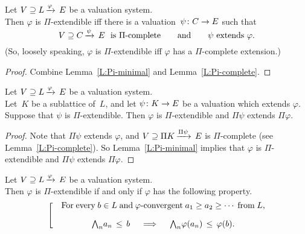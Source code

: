 \documentclass[main.tex]{subfiles}
\begin{document}
%
%
\begin{cor}
Let $V \supseteq L\,\smash{\xrightarrow{\varphi}\,E}$ be a valuation system.\\
Then $\varphi$ is $\Pi$-extendible
iff 
there is a valuation~$\psi\colon C\rightarrow E$
such that 
\begin{equation*}
V \supseteq C\,\smash{\xrightarrow{\psi}\,E}\text{ \ is $\Pi$-complete}
\qquad\text{and}\qquad
\psi\text{ extends }\varphi.
\end{equation*}
(So, loosely speaking,
$\varphi$ is $\Pi$-extendible
iff $\varphi$ has a $\Pi$-complete extension.)
\end{cor}
\begin{proof}
Combine Lemma~\ref{L:Pi-minimal}
and Lemma~\ref{L:Pi-complete}.
\end{proof}
%
%
\begin{lem}
\label{L:Pi-monotonous}
Let $V \supseteq L\,\smash{\xrightarrow{\varphi}\,E}$ be a valuation system.\\
Let~$K$ be a sublattice of~$L$,
and let $\psi\colon K\rightarrow E$ be a valuation
which extends $\varphi$.\\
Suppose that $\psi$ is $\Pi$-extendible.
Then $\varphi$ is $\Pi$-extendible
and  $\Pi\psi$ extends $\Pi\varphi$.
\end{lem}
\begin{proof}
Note that $\Pi\psi$ extends $\varphi$,
and $V \supseteq \Pi K\,\smash{\xrightarrow{\Pi \psi}\,E}$
is $\Pi$-complete (see Lemma~\ref{L:Pi-complete}).
So Lemma~\ref{L:Pi-minimal}
implies that
$\varphi$ is $\Pi$-extendible
and $\Pi\psi$ extends $\Pi\varphi$.
\end{proof}
%
%
\begin{lem}
\label{L:Pi-continuity}
Let $V \supseteq L\,\smash{\xrightarrow{\varphi}\,E}$ be a valuation system.\\
Then $\varphi$ is $\Pi$-extendible
if and only if  $\varphi$
has the following property.
\begin{equation}
\label{eq:Pi-cont}
\left[ \quad
\begin{minipage}{.7\columnwidth}
For every $b\in L$ and $\varphi$-convergent
 $a_1 \geq a_2 \geq \dotsb$ from~$L$,
\begin{equation*}
\bw_n a_n \,\leq\, b
\quad\implies\quad
\bw_n \varphi (a_n) \,\leq\, \varphi(b).
\end{equation*}
\end{minipage}
\right.
\end{equation}
\end{lem}
\end{document}
